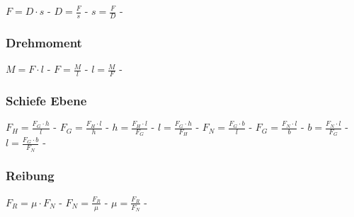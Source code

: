 $ F = D\cdot s $ - $ D = \frac{F}{s} $ - $ s = \frac{F}{D} $ - \\ 
 
\subsubsection{Drehmoment} 
\begin{minipage}{0.45\textwidth} 
\end{minipage} 
\begin{minipage}{0.45\textwidth} 
 
\legende{}\end{minipage} 
 
$ M = F\cdot l $ - $ F = \frac{M}{l} $ - $ l = \frac{M}{F} $ - \\ 
 
\subsubsection{Schiefe Ebene} 
\begin{minipage}{0.45\textwidth} 
\end{minipage} 
\begin{minipage}{0.45\textwidth} 
 
\legende{}\end{minipage} 
 
$ F_{H}  = \frac{F_{G} \cdot h}{ l} $ - $ F_{G}  = \frac{F_{H} \cdot l}{ h} $ - $ h = \frac{F_{H} \cdot l}{ F_{G} } $ - $ l = \frac{F_{G} \cdot h}{ F_{H} } $ - $ F_{N}  = \frac{F_{G} \cdot b}{ l} $ - $ F_{G}  = \frac{F_{N} \cdot l}{ b} $ - $ b = \frac{F_{N} \cdot l}{ F_{G} } $ - $ l = \frac{F_{G} \cdot b}{ F_{N} } $ - \\ 
 
\subsubsection{Reibung} 
\begin{minipage}{0.45\textwidth} 
\end{minipage} 
\begin{minipage}{0.45\textwidth} 
 
\legende{}\end{minipage} 
 
$ F_{R}  = \mu \cdot F_{N} $ - $ F_{N}  = \frac{F_{R} }{\mu } $ - $ \mu  = \frac{F_{R} }{F_{N} } $ - \\ 
 
